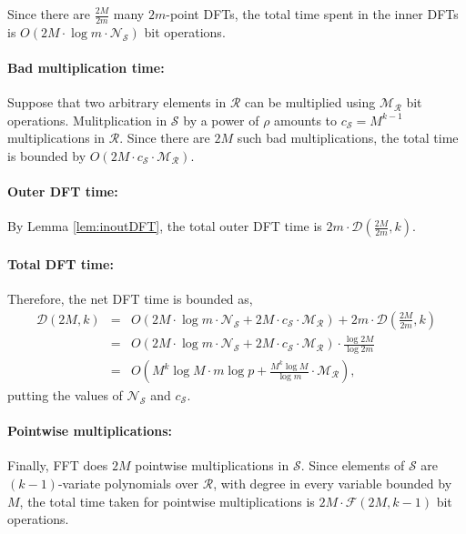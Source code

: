 \documentclass[11pt]{article}
\begin{document}
Since there are $\frac{2M}{2m}$ many $2m$-point DFTs, the total time
spent in the inner DFTs is $O(2M \cdot \log m \cdot
\mathcal{N}_{\mathcal{S}})$ bit operations.

\paragraph{Bad multiplication time:}
Suppose that two arbitrary elements in $\mathcal{R}$ can be multiplied
using $\mathcal{M}_{\mathcal{R}}$ bit operations. Mulitplication in
$\mathcal{S}$ by a power of $\rho$ amounts to $c_{\mathcal{S}} =
M^{k-1}$ multiplications in $\mathcal{R}$. Since there are $2M$ such
bad multiplications, the total time is bounded by $O(2M \cdot
c_{\mathcal{S}} \cdot \mathcal{M}_{\mathcal{R}})$.

\paragraph{Outer DFT time:}
By Lemma \ref{lem:inoutDFT}, the total outer DFT time is $2m \cdot
\mathcal{D}\left(\frac{2M}{2m}, k \right)$.

\paragraph{Total DFT time:}Therefore, the net DFT time is bounded as,
\begin{eqnarray*}
\mathcal{D}(2M, k) &=& O\left(2M \cdot \log m \cdot \mathcal{N}_{\mathcal{S}} +
  2M \cdot c_{\mathcal{S}} \cdot \mathcal{M}_{\mathcal{R}}\right) +
2m \cdot \mathcal{D}\left(\frac{2M}{2m}, k\right) \\
&=& O\left(2M \cdot \log m \cdot \mathcal{N}_{\mathcal{S}} +
  2M \cdot c_{\mathcal{S}} \cdot \mathcal{M}_{\mathcal{R}}\right) \cdot
\frac{\log 2M}{ \log 2m} \\
&=& O\left(M^k \log M \cdot m \log p + \frac{M^k \log M}{\log m} \cdot
  \mathcal{M}_{\mathcal{R}}\right),
\end{eqnarray*}
putting the values of $\mathcal{N}_{\mathcal{S}}$ and $c_{\mathcal{S}}$.

\paragraph{Pointwise multiplications:}
Finally, FFT does $2M$ pointwise multiplications in
$\mathcal{S}$. Since elements of $\mathcal{S}$ are $(k-1)$-variate
polynomials over $\mathcal{R}$, with degree in every variable bounded
by $M$, the total time taken for pointwise multiplications is $2M
\cdot \mathcal{F}(2M, k-1)$ bit operations.
\end{document}
